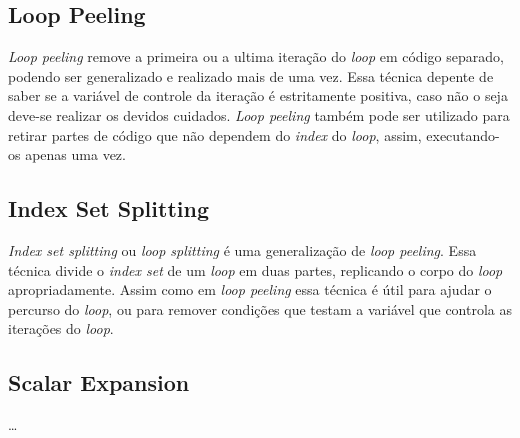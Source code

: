 \subsection{Loop Peeling}

\textit{Loop peeling} remove a primeira ou a ultima iteração do \textit{loop} 
em código separado, podendo ser generalizado e realizado mais de uma vez. 
Essa técnica depente de saber se a variável de controle da iteração é estritamente
positiva, caso não o seja deve-se realizar os devidos cuidados. 
\textit{Loop peeling} também pode ser utilizado para retirar partes de código 
que não dependem do \textit{index} do \textit{loop}, assim, executando-os apenas
uma vez.


\subsection{Index Set Splitting}

\textit{Index set splitting} ou \textit{loop splitting} é uma generalização de 
\textit{loop peeling}. Essa técnica divide o \textit{index set} de um
\textit{loop} em duas partes, replicando o corpo do \textit{loop}
apropriadamente. 
Assim como em \textit{loop peeling} essa técnica é útil para ajudar o percurso
do \textit{loop}, ou para remover condições que testam a variável que controla
as iterações do \textit{loop}.



\subsection{Scalar Expansion} 

\ldots
